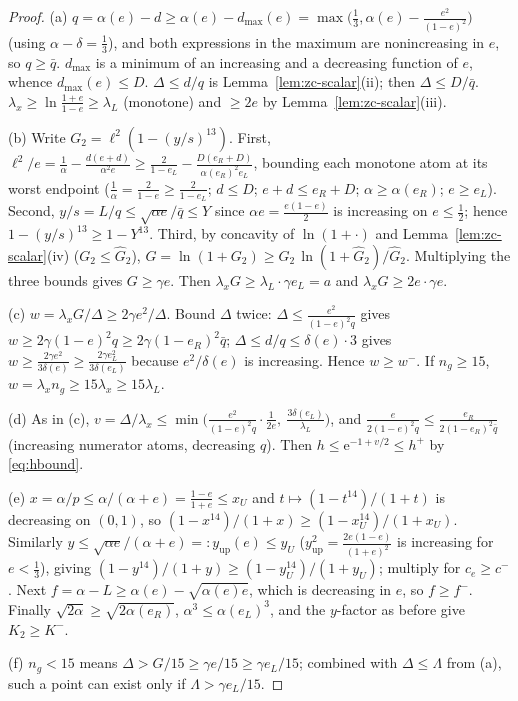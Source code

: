 \documentclass[11pt]{article}
\theoremstyle{remark}
\theoremstyle{plain}
\theoremstyle{plain}
\newcommand{\eu}{\mathrm{e}}
\begin{document}
\begin{proof}
(a) $q=\alpha(e)-d\ge\alpha(e)-d_{\max}(e)
=\max\bigl(\tfrac13,\alpha(e)-\tfrac{e^2}{(1-e)^2}\bigr)$ (using
$\alpha-\delta=\tfrac13$), and both expressions in the maximum are
nonincreasing in $e$, so $q\ge\bar q$.  $d_{\max}$ is a minimum of an
increasing and a decreasing function of $e$, whence $d_{\max}(e)\le D$.
$\Delta\le d/q$ is Lemma~\ref{lem:zc-scalar}(ii); then $\Delta\le D/\bar q$.
$\lambda_x\ge\ln\frac{1+e}{1-e}\ge\lambda_L$ (monotone) and $\ge2e$ by
Lemma~\ref{lem:zc-scalar}(iii).

(b) Write $G_2=\ell^2(1-(y/s)^{13})$.  First,
$\ell^2/e=\frac1\alpha-\frac{d(e+d)}{\alpha^2e}
\ge\frac2{1-e_L}-\frac{D(e_R+D)}{\alpha(e_R)^2e_L}$,
bounding each monotone atom at its worst endpoint
($\tfrac1\alpha=\tfrac2{1-e}\ge\tfrac2{1-e_L}$; $d\le D$; $e+d\le e_R+D$;
$\alpha\ge\alpha(e_R)$; $e\ge e_L$).  Second,
$y/s=L/q\le\sqrt{\alpha e}/\bar q\le Y$ since
$\alpha e=\tfrac{e(1-e)}2$ is increasing on $e\le\tfrac12$; hence
$1-(y/s)^{13}\ge1-Y^{13}$.  Third, by concavity of $\ln(1+\cdot)$ and
Lemma~\ref{lem:zc-scalar}(iv) ($G_2\le\widehat G_2$),
$G=\ln(1+G_2)\ge G_2\,\ln(1+\widehat G_2)/\widehat G_2$.  Multiplying the
three bounds gives $G\ge\gamma e$.  Then
$\lambda_xG\ge\lambda_L\cdot\gamma e_L=a$ and
$\lambda_xG\ge2e\cdot\gamma e$.

(c) $w=\lambda_xG/\Delta\ge2\gamma e^2/\Delta$.  Bound $\Delta$ twice:
$\Delta\le\frac{e^2}{(1-e)^2q}$ gives
$w\ge2\gamma(1-e)^2q\ge2\gamma(1-e_R)^2\bar q$;
$\Delta\le d/q\le\delta(e)\cdot3$ gives
$w\ge\frac{2\gamma e^2}{3\delta(e)}\ge\frac{2\gamma e_L^2}{3\delta(e_L)}$
because $e^2/\delta(e)$ is increasing.  Hence $w\ge w^-$.  If $n_g\ge15$,
$w=\lambda_xn_g\ge15\lambda_x\ge15\lambda_L$.

(d) As in (c), $v=\Delta/\lambda_x
\le\min\bigl(\frac{e^2}{(1-e)^2q}\cdot\frac1{2e},\
\frac{3\delta(e_L)}{\lambda_L}\bigr)$, and
$\frac{e}{2(1-e)^2q}\le\frac{e_R}{2(1-e_R)^2\bar q}$ (increasing numerator
atoms, decreasing $q$).  Then $h\le\eu^{-1+v/2}\le h^+$ by
\eqref{eq:hbound}.

(e) $x=\alpha/p\le\alpha/(\alpha+e)=\frac{1-e}{1+e}\le x_U$ and
$t\mapsto(1-t^{14})/(1+t)$ is decreasing on $(0,1)$, so
$(1-x^{14})/(1+x)\ge(1-x_U^{14})/(1+x_U)$.  Similarly
$y\le\sqrt{\alpha e}/(\alpha+e)=:y_{\mathrm{up}}(e)\le y_U$
($y_{\mathrm{up}}^2=\frac{2e(1-e)}{(1+e)^2}$ is increasing for
$e<\tfrac13$), giving $(1-y^{14})/(1+y)\ge(1-y_U^{14})/(1+y_U)$; multiply
for $c_e\ge c^-$.  Next $f=\alpha-L\ge\alpha(e)-\sqrt{\alpha(e)e}$, which is
decreasing in $e$, so $f\ge f^-$.  Finally
$\sqrt{2\alpha}\ge\sqrt{2\alpha(e_R)}$, $\alpha^3\le\alpha(e_L)^3$, and the
$y$-factor as before give $K_2\ge K^-$.

(f) $n_g<15$ means $\Delta>G/15\ge\gamma e/15\ge\gamma e_L/15$; combined
with $\Delta\le\Lambda$ from (a), such a point can exist only if
$\Lambda>\gamma e_L/15$.
\end{proof}
\end{document}
